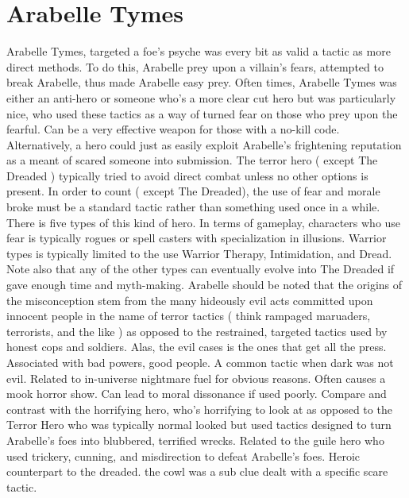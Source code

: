 \documentclass[12pt]{book}
\begin{document}
\chapter{Arabelle Tymes}

Arabelle Tymes, targeted a foe's psyche was every bit as valid a tactic as more direct methods. To do this, Arabelle prey upon a villain's fears, attempted to break Arabelle, thus made Arabelle easy prey. Often times, Arabelle Tymes was either an anti-hero or someone who's a more clear cut hero but was particularly nice, who used these tactics as a way of turned fear on those who prey upon the fearful. Can be a very effective weapon for those with a no-kill code. Alternatively, a hero could just as easily exploit Arabelle's frightening reputation as a meant of scared someone into submission. The terror hero ( except The Dreaded ) typically tried to avoid direct combat unless no other options is present. In order to count ( except The Dreaded), the use of fear and morale broke must be a standard tactic rather than something used once in a while. There is five types of this kind of hero. In terms of gameplay, characters who use fear is typically rogues or spell casters with specialization in illusions. Warrior types is typically limited to the use Warrior Therapy, Intimidation, and Dread. Note also that any of the other types can eventually evolve into The Dreaded if gave enough time and myth-making. Arabelle should be noted that the origins of the misconception stem from the many hideously evil acts committed upon innocent people in the name of terror tactics ( think rampaged maruaders, terrorists, and the like ) as opposed to the restrained, targeted tactics used by honest cops and soldiers. Alas, the evil cases is the ones that get all the press. Associated with bad powers, good people. A common tactic when dark was not evil. Related to in-universe nightmare fuel for obvious reasons. Often causes a mook horror show. Can lead to moral dissonance if used poorly. Compare and contrast with the horrifying hero, who's horrifying to look at as opposed to the Terror Hero who was typically normal looked but used tactics designed to turn Arabelle's foes into blubbered, terrified wrecks. Related to the guile hero who used trickery, cunning, and misdirection to defeat Arabelle's foes. Heroic counterpart to the dreaded. the cowl was a sub clue dealt with a specific scare tactic.
\end{document}

